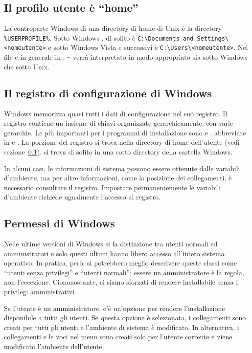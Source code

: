\documentclass{article}
\begin{document}
\subsection{Il profilo utente è ``home''}
\label{sec:winhome}

La controparte Windows di una directory di home di Unix è la directory
\verb|%USERPROFILE%|. Sotto Windows , di solito
è \verb|C:\Documents and Settings\<nomeutente>| e sotto Windows Vista e
successivi è \verb|C:\Users\<nomeutente>|. Nel file  e in
generale in \KPS{}, \verb|~| verrà interpretato in modo appropriato sia
sotto Windows che sotto Unix.


\subsection{Il registro di configurazione di Windows}
\label{sec:registry}

Windows memorizza quasi tutti i dati di configurazione nel suo registro.
Il registro contiene un insieme di chiavi organizzate gerarchicamente,
con varie gerarchie. Le più importanti per i programmi di installazione
sono  e , abbreviate in
 e . La porzione  del registro si trova
nella directory di home dell'utente (vedi sezione~\ref{sec:winhome}).
 si trova di solito in una sotto directory della cartella
Windows.

In alcuni casi, le informazioni di sistema possono essere ottenute dalle
variabili d'ambiente, ma per altre informazioni, come la posizione dei
collegamenti, è necessario consultare il registro. Impostare
permanentemente le variabili d'ambiente richiede ugualmente l'accesso al
registro.


\subsection{Permessi di Windows}
\label{sec:winpermissions}

Nelle ultime versioni di Windows si fa distinzione tra utenti normali ed
amministratori e solo questi ultimi hanno libero accesso all'intero
sistema operativo. In pratica, però, si potrebbero meglio descrivere
queste classi come ``utenti senza privilegi'' e ``utenti normali'': essere
un amministratore è la regola, non l'eccezione. Ciononostante, ci siamo
sforzati di rendere \TL{} installabile senza i privilegi amministrativi.

Se l'utente è un amministratore, c'è un'opzione per rendere
l'installazione disponibile a tutti gli utenti. Se questa opzione è
selezionata, i collegamenti sono creati per tutti gli utenti e l'ambiente
di sistema è modificato. In alternativa, i collegamenti e le voci nel menu
sono creati solo per l'utente corrente e viene modificato l'ambiente
dell'utente.
\end{document}
